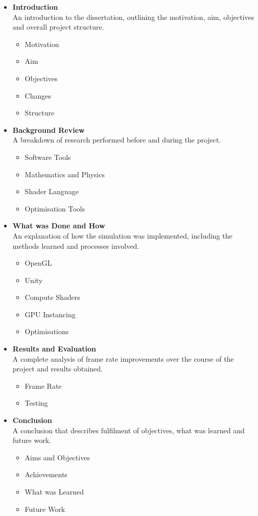 \documentclass[12pt]{article}
\begin{document}
    \begin{itemize}
        \item \textbf{Introduction} \\
        An introduction to the dissertation, outlining the motivation, aim, objectives and overall project structure. 
        \begin{itemize}
            \item Motivation
            \item Aim
            \item Objectives
            \item Changes
            \item Structure
        \end{itemize}
        \item \textbf{Background Review} \\
        A breakdown of research performed before and during the project.
        \begin{itemize}
            \item Software Tools
            \item Mathematics and Physics
            \item Shader Language
            \item Optimisation Tools
        \end{itemize}
        \item \textbf{What was Done and How} \\
        An explanation of how the simulation was implemented, including the methods learned and processes involved.
        \begin{itemize}
            \item OpenGL
            \item Unity
            \item Compute Shaders
            \item GPU Instancing
            \item Optimisations
        \end{itemize}
        \item \textbf{Results and Evaluation} \\
        A complete analysis of frame rate improvements over the course of the project and results obtained.
        \begin{itemize}
            \item Frame Rate
            \item Testing
        \end{itemize}
        \item \textbf{Conclusion} \\
        A conclusion that describes fulfilment of objectives, what was learned and future work.
        \begin{itemize}
            \item Aims and Objectives
            \item Achievements
            \item What was Learned
            \item Future Work
        \end{itemize}
    \end{itemize}
\end{document}
